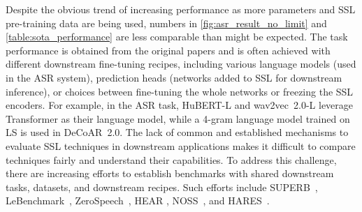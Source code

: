 Despite the obvious trend of increasing performance as more parameters and SSL
pre-training data are being used, numbers in \cref{fig:asr_result_no_limit} 
and \cref{table:sota_performance} are less comparable than might be expected.
The task performance is obtained from the original papers and is often
achieved with different downstream fine-tuning recipes, including various
language models (used in the ASR system), prediction heads (networks added to
SSL for downstream inference), or choices between fine-tuning the whole
networks or freezing the SSL encoders. For example, in the ASR task, HuBERT-L
and wav2vec~2.0-L leverage Transformer as their language model, while a 4-gram
language model trained on LS is used in DeCoAR~2.0. The lack of common and
established mechanisms to evaluate SSL techniques in downstream applications
makes it difficult to compare techniques fairly and understand their
capabilities. To address this challenge, there are increasing efforts to establish
benchmarks with shared downstream tasks, datasets, and downstream recipes. Such
efforts include SUPERB~\cite{yang21c_interspeech}, 
LeBenchmark~\cite{evain21_interspeech}, ZeroSpeech~\cite{dunbar2020zero},
HEAR \cite{pmlr-v176-turian22a},
NOSS~\cite{shor20_interspeech}, and HARES~\cite{wang2021towards}. 

